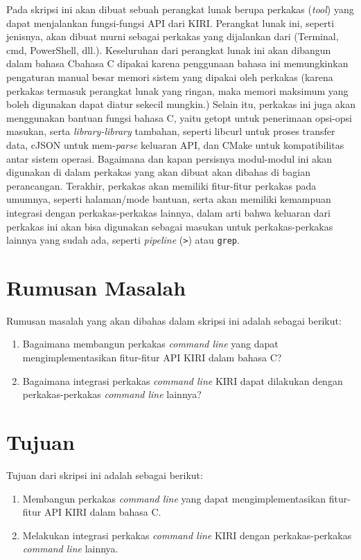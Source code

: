 Pada skripsi ini akan dibuat sebuah perangkat lunak berupa perkakas \cl\xspace (\cl\xspace\textit{tool}) yang dapat menjalankan fungsi-fungsi API dari KIRI. Perangkat lunak ini, seperti jenisnya, akan dibuat murni sebagai perkakas yang dijalankan dari \cl\xspace (Terminal, cmd, PowerShell, dll.). Keseluruhan dari perangkat lunak ini akan dibangun dalam bahasa C\textemdash bahasa C dipakai karena penggunaan bahasa ini memungkinkan pengaturan manual besar memori sistem yang dipakai oleh perkakas \cite{raymond:2003:artofunixprogramming} (karena perkakas termasuk perangkat lunak yang ringan, maka memori maksimum yang boleh digunakan dapat diatur sekecil mungkin.) Selain itu, perkakas ini juga akan menggunakan bantuan fungsi bahasa C, yaitu getopt untuk penerimaan opsi-opsi masukan, serta \textit{library-library} tambahan, seperti libcurl untuk proses transfer data, cJSON untuk mem-\textit{parse} keluaran API, dan CMake untuk kompatibilitas antar sistem operasi. Bagaimana dan kapan persisnya modul-modul ini akan digunakan di dalam perkakas yang akan dibuat akan dibahas di bagian perancangan. Terakhir, perkakas akan memiliki fitur-fitur perkakas \cl\xspace pada umumnya, seperti halaman/mode bantuan, serta akan memiliki kemampuan integrasi dengan perkakas-perkakas \cl\xspace lainnya, dalam arti bahwa keluaran dari perkakas ini akan bisa digunakan sebagai masukan untuk perkakas-perkakas \cl\xspace lainnya yang sudah ada, seperti \textit{pipeline} (\verb|>|) atau \verb|grep|.

\section{Rumusan Masalah}
\label{sec:rumusan}
Rumusan masalah yang akan dibahas dalam skripsi ini adalah sebagai berikut:
\begin{enumerate}
	\item Bagaimana membangun perkakas \textit{command line} yang dapat mengimplementasikan fitur-fitur API KIRI dalam bahasa C?
	\item Bagaimana integrasi perkakas \textit{command line} KIRI dapat dilakukan dengan perkakas-perkakas \textit{command line} lainnya?
\end{enumerate}

\section{Tujuan}
\label{sec:tujuan}
Tujuan dari skripsi ini adalah sebagai berikut:
\begin{enumerate}
	\item Membangun perkakas \textit{command line} yang dapat mengimplementasikan fitur-fitur API KIRI dalam bahasa C.
	\item Melakukan integrasi perkakas \textit{command line} KIRI dengan perkakas-perkakas \textit{command line} lainnya.
\end{enumerate}
\vspace{-0.5em} %
